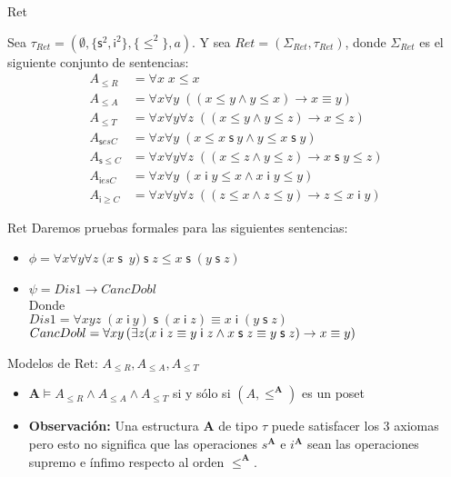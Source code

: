 \documentclass[10pt]{beamer}
\newcommand{\A}{\mathbf{A}}
\newcommand{\poset}{(A, \leq^{\mathbf{A}})}
\newcommand{\Nand}{\wedge}
\newcommand{\refl}{\forall x\;x\leq x}
\newcommand{\Nrefl}{{A}_{\leq R}}
\newcommand{\anti}{\forall x\forall y\;\left( \left( x\leq y\wedge y\leq
x\right) \rightarrow x\equiv y\right)}
\newcommand{\Nanti}{{A}_{\leq A}}
\newcommand{\trans}{\forall x\forall y\forall z\;\left( (x\leq y\wedge
y\leq z)\rightarrow x\leq z\right)}
\newcommand{\Ntrans}{{A}_{\leq T}}
\newcommand{\sCot}{\forall x\forall y\;(x\leq x\;\mathsf{s}\ y\wedge y\leq x\;\mathsf{s}\;y)}
\newcommand{\NsCot}{{A}_{\mathsf{s}esC}}
\newcommand{\sLesCot}{\forall x\forall y\forall z\;\left( (x\leq
z\wedge y\leq z)\rightarrow x\;\text{$\mathsf{s\;}$}y\leq z\right)}
\newcommand{\NsLesCot}{{A}_{\mathsf{s}\leq C}}
\newcommand{\iCot}{\forall x\forall y\;(x\;\mathsf{i}\;y\leq
x\wedge x\;\mathsf{i}\;y\leq y)}
\newcommand{\NiCot}{{A}_{\mathsf{i}esC}}
\newcommand{\iGrCot}{\forall x\forall y\forall z\;\left( (z\leq
x\wedge z\leq y)\rightarrow z\leq x\;\mathsf{i}\;y\right)}
\newcommand{\NiGrCot}{{A}_{\mathsf{i}\geq C}}
\newcommand{\assoc}{\forall x\forall y\forall
z\;(x\;\mathsf{s}$\ $y)\;\mathsf{s}\;z\leq x\;\mathsf{s}\;(y\;\mathsf{s}\;z)}
\newcommand{\acot}{Dis1\rightarrow CancDobl}
\begin{document}
\begin{frame}{Ret}
  \begin{center}

    Sea $\tau _{Ret}=(\emptyset ,\{\mathsf{s}^{2},\mathsf{i}^{2}\},\{\leq
    ^{2}\},a)$. Y sea $Ret=(\Sigma _{Ret},\tau _{Ret})$, donde $\Sigma _{Ret}$
    es el siguiente conjunto de sentencias:
    \pause
    \begin{align}
       \Nrefl &= \refl \nonumber\\
       \Nanti &= \anti \nonumber \\
       \Ntrans &= \trans \nonumber \\
       \NsCot &= \sCot \nonumber \\
       \NsLesCot &= \sLesCot \nonumber \\
       \NiCot &= \iCot \nonumber \\
       \NiGrCot &= \iGrCot \nonumber
    \end{align}
    \setcounter{equation}{0}



  \end{center}
\end{frame}

\begin{frame}{Ret}
  Daremos pruebas formales para las siguientes sentencias:
  \begin{itemize}[<+->]

  \item $ \phi = \assoc $
  \item  $ \psi = \acot $
  \\ Donde \\ $Dis1 = \forall xyz\;(x\;\mathsf{i}\
  y)\;\mathsf{s}\;(x\;\mathsf{i}\;z)\equiv x\;\mathsf{i}\;(y\;\mathsf{s}%
  \;z)$
  \\ $ CancDobl = \forall xy\left( \exists z(x\;\mathsf{i}\;z\equiv y\;\mathsf{%
  i}\;z\wedge x\;\mathsf{s}\;z\equiv y\;\mathsf{s}\;z)\rightarrow x\equiv
  y\right)$
  \end{itemize}

\end{frame}


\begin{frame}{Modelos de Ret: $ \Nrefl, \Nanti, \Ntrans$}

  \begin{itemize}[<+->]

    \item $ \A \models \Nrefl \Nand \Nanti \Nand \Ntrans $ si y sólo si
    $\poset$ es un poset

    \item \textbf{Observación:} Una estructura $\A$ de tipo $\tau$ puede
            satisfacer los 3 axiomas pero esto no significa que las operaciones
            $ s^{\A} $ e $ i^{\A} $ sean las operaciones supremo e ínfimo respecto
            al orden $ \leq^{\A} $.
  \end{itemize}
\end{frame}
\end{document}
